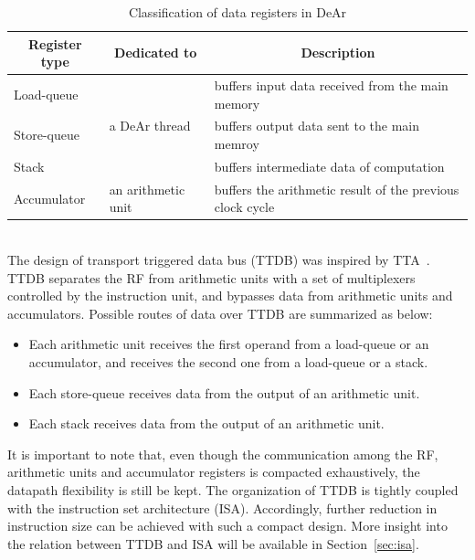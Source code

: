 \begin{table}[!ht]
    \caption{Classification of data registers in DeAr}
    \label{tab:register}
    \centering
    \begin{tabular}{|l|l|l|}
        \hline
        \multicolumn{1}{|c|}{\textbf{Register type}} & \multicolumn{1}{c|}{\textbf{Dedicated to}} & \multicolumn{1}{c|}{\textbf{Description}}                 \\ \hline
        Load-queue                                   & \multirow{3}{*}{a DeAr thread}             & buffers input data received from the main memory          \\ \cline{1-1} \cline{3-3} 
        Store-queue                                  &                                            & buffers output data sent to the main memroy               \\ \cline{1-1} \cline{3-3} 
        Stack                                        &                                            & buffers intermediate data of computation                  \\ \hline
        Accumulator                                  & an arithmetic unit                         & buffers the arithmetic result of the previous clock cycle \\ \hline
    \end{tabular}
\end{table}
\\\indent
The design of transport triggered data bus (TTDB) was inspired by TTA~\cite{tta}.
TTDB separates the RF from arithmetic units with a set of multiplexers controlled by the instruction unit, 
and bypasses data from arithmetic units and accumulators.
Possible routes of data over TTDB are summarized as below:
\begin{itemize}
    \item Each arithmetic unit receives the first operand from a load-queue or an accumulator, 
        and receives the second one from a load-queue or a stack.
    \item Each store-queue receives data from the output of an arithmetic unit.
    \item Each stack receives data from the output of an arithmetic unit.
\end{itemize}
\indent
It is important to note that, even though the communication among the RF, arithmetic units and accumulator registers is compacted exhaustively, 
the datapath flexibility is still be kept.
The organization of TTDB is tightly coupled with the instruction set architecture (ISA).
Accordingly, further reduction in instruction size can be achieved with such a compact design.
More insight into the relation between TTDB and ISA will be available in Section~\ref{sec:isa}.

